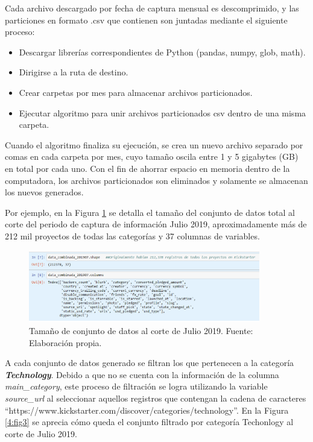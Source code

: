 Cada archivo descargado por fecha de captura mensual es descomprimido, y las particiones en formato .csv que contienen son juntadas mediante el siguiente proceso:

\begin{itemize}
	\item Descargar librerías correspondientes de Python (pandas, numpy, glob, math).
	\item Dirigirse a la ruta de destino.
	\item Crear carpetas por mes para almacenar archivos particionados.
	\item Ejecutar algoritmo para unir archivos particionados csv dentro de una misma carpeta.
\end{itemize}

Cuando el algoritmo finaliza su ejecución, se crea un nuevo archivo separado por comas en cada carpeta por mes, cuyo tamaño oscila entre 1 y 5 gigabytes (GB) en total por cada uno. Con el fin de ahorrar espacio en memoria dentro de la computadora, los archivos particionados son eliminados y solamente se almacenan los nuevos generados.

Por ejemplo, en la Figura \ref{4:fig2} se detalla el tamaño del conjunto de datos total al corte del periodo de captura de información Julio 2019, aproximadamente más de 212 mil proyectos de todas las categorías y 37 columnas de variables.

\begin{figure}[h]
	\begin{center}
		\includegraphics[width=0.9\textwidth]{4/figures/dataset_201907.png}
		\caption{Tamaño de conjunto de datos al corte de Julio 2019. Fuente: Elaboración propia.}
		\label{4:fig2}
	\end{center}
\end{figure}

A cada conjunto de datos generado se filtran los que pertenecen a la categoría \textit{\textbf{Technology}}. Debido a que no se cuenta con la información de la columna \textit{main\_category}, este proceso de filtración se logra utilizando la variable \textit{source\_url} al seleccionar aquellos registros que contengan la cadena de caracteres “https://www.kickstarter.com/discover/categories/technology”. En la Figura \ref{4:fig3} se aprecia cómo queda el conjunto filtrado por categoría Techonlogy al corte de Julio 2019.

